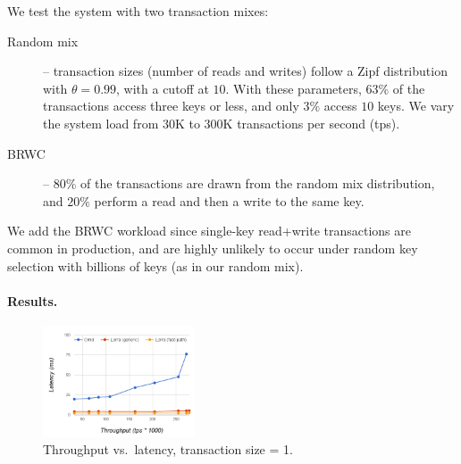 We test the system with two transaction mixes:
\begin{description}
\item[Random mix] -- 
transaction sizes (number of reads and writes) follow a Zipf distribution with $\theta=0.99$, with a cutoff at $10$. 
With these parameters, $63\%$ of the transactions access three keys or less, and only $3\%$ access $10$ keys. 
We vary the system load from 30K to 300K transactions per second (tps). 
\item[BRWC] -- $80\%$ of the transactions are drawn from the random mix distribution, and $20\%$ perform a read
and then a write to the same key. 
\end{description}

We add the BRWC workload since single-key read+write transactions are common in production, and are highly unlikely to 
occur under random key selection with billions of keys (as in our random mix).

\paragraph{Results.} 

\begin{figure}[t]
\centering
	\includegraphics[width=0.4\textwidth]{figs/thpt-latency-1.png}
	\caption{Throughput vs.\ latency, transaction size = 1.}
  \label{fig:tl-1}
\end{figure}

